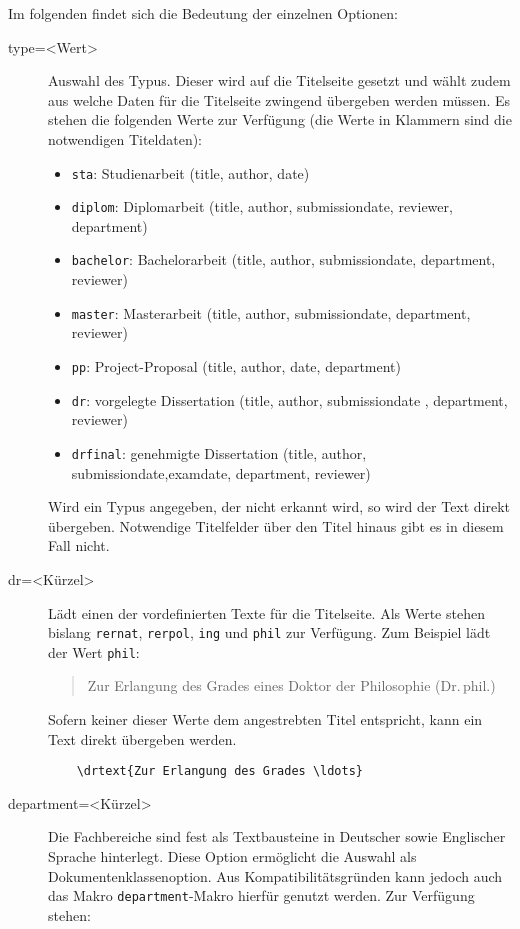 \documentclass[
	german,%
	accentcolor=9c,%
	ruledheaders=chapter,%
	class=book,%
	thesis={%
			type=dr,
			dr=rernat
		},
	fontsize=11pt,%
	parskip=half-,%
	custommargins=true,%
	marginpar=false,%
]{tudapub}
\newcommand*{\code}[1]{\texttt{#1}}
\begin{document}
Im folgenden findet sich die Bedeutung der einzelnen Optionen:
\begin{description}
	\item[type=<Wert>] Auswahl des Typus. Dieser wird auf die Titelseite gesetzt und wählt zudem aus welche Daten für die Titelseite zwingend übergeben werden müssen.
	      Es stehen die folgenden Werte zur Verfügung (die Werte in Klammern sind die notwendigen Titeldaten):
	      \begin{itemize}
		      \item \code{sta}: Studienarbeit (title, author, date)
		      \item \code{diplom}: Diplomarbeit (title, author, submissiondate, reviewer, department)
		      \item \code{bachelor}: Bachelorarbeit (title, author, submissiondate, department, reviewer)
		      \item \code{master}: Masterarbeit (title, author, submissiondate, department, reviewer)
		      \item \code{pp}: Project-Proposal  (title, author, date, department)
		      \item \code{dr}: vorgelegte Dissertation (title, author, submissiondate , department, reviewer)
		      \item \code{drfinal}: genehmigte Dissertation (title, author, submissiondate,examdate, department, reviewer)
	      \end{itemize}
	      Wird ein Typus angegeben, der nicht erkannt wird, so wird der Text direkt übergeben. Notwendige Titelfelder über den Titel hinaus gibt es in diesem Fall nicht.
	\item[dr=<Kürzel>] Lädt einen der vordefinierten Texte für die Titelseite. Als Werte stehen bislang \code{rernat}, \code{rerpol}, \code{ing} und \code{phil} zur Verfügung. Zum Beispiel lädt der Wert \code{phil}:
	      \begin{quote}
		      Zur Erlangung des Grades eines Doktor der Philosophie (Dr.\,phil.)
	      \end{quote}
	      Sofern keiner dieser Werte dem angestrebten Titel entspricht, kann ein Text direkt übergeben werden.
\begin{verbatim}
    \drtext{Zur Erlangung des Grades \ldots}
\end{verbatim}
	\item[department=<Kürzel>] Die Fachbereiche sind fest als Textbausteine in Deutscher sowie Englischer Sprache hinterlegt. Diese Option ermöglicht die Auswahl als Dokumentenklassenoption. Aus Kompatibilitätsgründen kann jedoch auch das Makro \code{department}-Makro hierfür genutzt werden. Zur Verfügung stehen:\par

\end{description}
\end{document}

